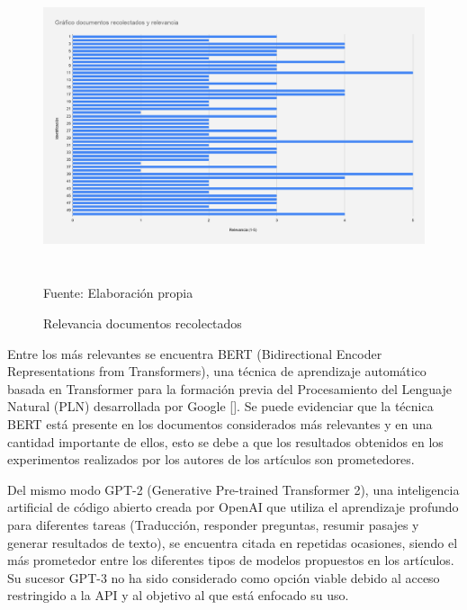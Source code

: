 \documentclass[../Main.tex]{subfiles}
\begin{document}
\begin{figure}[H]
	\begin{Center}
		\includegraphics[width=6in,height=3.3in]{Images/GraficoPapers.png}
	    \caption{Relevancia documentos recolectados}
	    Fuente: Elaboración propia
        \label{fig:section}
	\end{Center}
\end{figure}

\begin{justify}
Entre los más relevantes se encuentra BERT (Bidirectional Encoder Representations from Transformers), una técnica de aprendizaje automático basada en Transformer para la formación previa del Procesamiento del Lenguaje Natural (PLN) desarrollada por Google []. Se puede evidenciar que la técnica BERT está presente en los documentos considerados más relevantes y en una cantidad importante de ellos, esto se debe a que los resultados obtenidos en los experimentos realizados por los autores de los artículos son prometedores.
\end{justify}

\begin{justify}
Del mismo modo GPT-2 (Generative Pre-trained Transformer 2), una inteligencia artificial de código abierto creada por OpenAI que  utiliza el aprendizaje profundo para diferentes tareas (Traducción, responder preguntas, resumir pasajes y generar resultados de texto), se encuentra citada en repetidas ocasiones, siendo el más prometedor entre los diferentes tipos de modelos propuestos en los artículos. Su sucesor GPT-3 no ha sido considerado como opción viable debido al acceso restringido a la API y al objetivo al que está enfocado su uso.
\end{justify}
\end{document}
